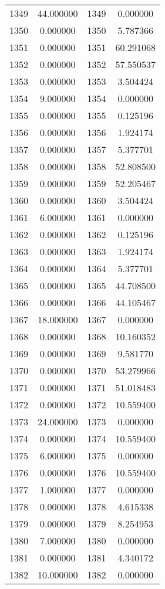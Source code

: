 \documentclass[12pt]{article}
\begin{document}
\begin{longtable}{@{}cccc@{}}
1349 & 44.000000 & 1349 & 0.000000 \\
1350 & 0.000000 & 1350 & 5.787366 \\
1351 & 0.000000 & 1351 & 60.291068 \\
1352 & 0.000000 & 1352 & 57.550537 \\
1353 & 0.000000 & 1353 & 3.504424 \\
1354 & 9.000000 & 1354 & 0.000000 \\
1355 & 0.000000 & 1355 & 0.125196 \\
1356 & 0.000000 & 1356 & 1.924174 \\
1357 & 0.000000 & 1357 & 5.377701 \\
1358 & 0.000000 & 1358 & 52.808500 \\
1359 & 0.000000 & 1359 & 52.205467 \\
1360 & 0.000000 & 1360 & 3.504424 \\
1361 & 6.000000 & 1361 & 0.000000 \\
1362 & 0.000000 & 1362 & 0.125196 \\
1363 & 0.000000 & 1363 & 1.924174 \\
1364 & 0.000000 & 1364 & 5.377701 \\
1365 & 0.000000 & 1365 & 44.708500 \\
1366 & 0.000000 & 1366 & 44.105467 \\
1367 & 18.000000 & 1367 & 0.000000 \\
1368 & 0.000000 & 1368 & 10.160352 \\
1369 & 0.000000 & 1369 & 9.581770 \\
1370 & 0.000000 & 1370 & 53.279966 \\
1371 & 0.000000 & 1371 & 51.018483 \\
1372 & 0.000000 & 1372 & 10.559400 \\
1373 & 24.000000 & 1373 & 0.000000 \\
1374 & 0.000000 & 1374 & 10.559400 \\
1375 & 6.000000 & 1375 & 0.000000 \\
1376 & 0.000000 & 1376 & 10.559400 \\
1377 & 1.000000 & 1377 & 0.000000 \\
1378 & 0.000000 & 1378 & 4.615338 \\
1379 & 0.000000 & 1379 & 8.254953 \\
1380 & 7.000000 & 1380 & 0.000000 \\
1381 & 0.000000 & 1381 & 4.340172 \\
1382 & 10.000000 & 1382 & 0.000000 \\

\end{longtable}
\end{document}
